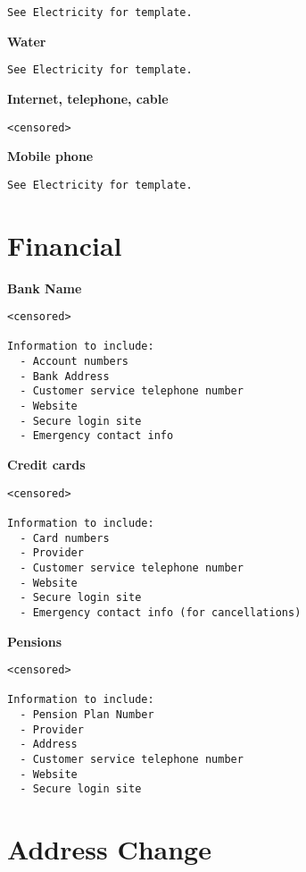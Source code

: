 \documentclass[]{book}
\theoremstyle{definition}
\theoremstyle{definition}
\theoremstyle{definition}
\theoremstyle{remark}
\begin{document}
\begin{verbatim}
See Electricity for template.
\end{verbatim}

\textbf{Water}

\begin{verbatim}
See Electricity for template.
\end{verbatim}

\textbf{Internet, telephone, cable}

\begin{verbatim}
<censored>
\end{verbatim}

\textbf{Mobile phone}

\begin{verbatim}
See Electricity for template.
\end{verbatim}

\section{Financial}\label{financial}

\textbf{Bank Name}

\begin{verbatim}
<censored>

Information to include:
  - Account numbers
  - Bank Address
  - Customer service telephone number
  - Website
  - Secure login site
  - Emergency contact info
\end{verbatim}

\textbf{Credit cards}

\begin{verbatim}
<censored>

Information to include:
  - Card numbers
  - Provider
  - Customer service telephone number
  - Website
  - Secure login site
  - Emergency contact info (for cancellations)
\end{verbatim}

\textbf{Pensions}

\begin{verbatim}
<censored>

Information to include:
  - Pension Plan Number
  - Provider
  - Address
  - Customer service telephone number
  - Website
  - Secure login site
\end{verbatim}

\section{Address Change}\label{address-change}
\end{document}
